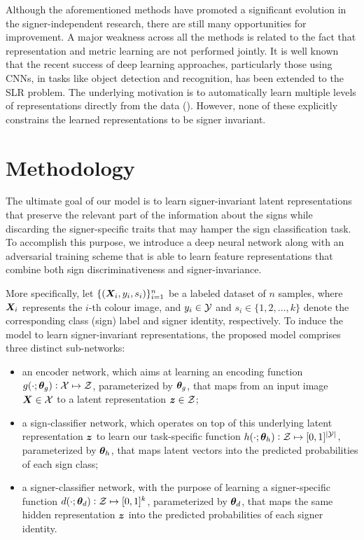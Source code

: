 Although the aforementioned methods have promoted a significant evolution in the signer-independent research, there are still many opportunities for improvement. A major weakness across all the methods is related to the fact that representation and metric learning are not performed jointly. It is well known that the recent success of deep learning approaches, particularly those using CNNs, in tasks like object detection and recognition, has been extended to the SLR problem. The underlying motivation is to automatically learn multiple levels of representations directly from the data (\citet{Pigou2015, Koller2016, Wu2016, Neverova2016, Kumar2017}). However, none of these explicitly constrains the learned representations to be signer invariant.

\section{Methodology}
\label{sec:adv_signer_inv_method}

The ultimate goal of our model is to learn signer-invariant latent representations that preserve the relevant part of the information about the signs while discarding the signer-specific traits that may hamper the sign classification task. To accomplish this purpose, we introduce a deep neural network along with an adversarial training scheme that is able to learn feature representations that combine both sign discriminativeness and signer-invariance.

More specifically, let $\{({\bm{X}}_{i},y_{i},s_{i})\}_{i=1}^{n}$ be a labeled dataset of $n$ samples, where ${\bm{X}}_{i}$ represents the $i$-th colour image, and $y_{i} \in {\mathcal{Y}}$ and $s_{i} \in \{1,2,\dots,k\}$ denote the corresponding class (sign) label and signer identity, respectively. To induce the model to learn signer-invariant representations, the proposed model comprises three distinct sub-networks:
\begin{itemize}
    \item an encoder network, which aims at learning an encoding function $g(\cdot;{\bm{\theta}}_g): {\mathcal{X}} \mapsto {\mathcal{Z}}$, parameterized by ${\bm{\theta}}_g$, that maps from an input image ${\bm{X}} \in {\mathcal{X}}$ to a latent representation ${\bm{z}} \in {\mathcal{Z}}$;
    \item a sign-classifier network, which operates on top of this underlying latent representation ${\bm{z}}$ to learn our task-specific function $h(\cdot; {\bm{\theta}}_h): {\mathcal{Z}} \mapsto [0,1]^{|{\mathcal{Y}}|}$, parameterized by ${\bm{\theta}}_h$, that maps latent vectors into the predicted probabilities of each sign class;
    \item a signer-classifier network, with the purpose of learning a signer-specific function $d(\cdot; {\bm{\theta}}_d): {\mathcal{Z}} \mapsto [0,1]^k$, parameterized by ${\bm{\theta}}_d$, that maps the same hidden representation ${\bm{z}}$ into the predicted probabilities of each signer identity.
\end{itemize}

